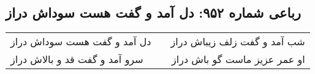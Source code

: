 \begin{center}
\section*{رباعی شماره ۹۵۲: دل آمد و گفت هست سوداش دراز}
\label{sec:0952}
\begin{longtable}{l p{0.5cm} r}
دل آمد و گفت هست سوداش دراز
&&
شب آمد و گفت زلف زیباش دراز
\\
سرو آمد و گفت قد و بالاش دراز
&&
او عمر عزیز ماست گو باش دراز
\\
\end{longtable}
\end{center}
